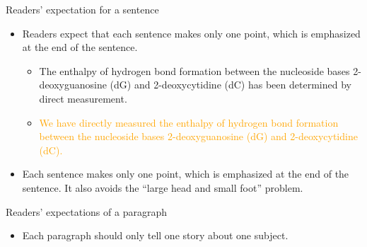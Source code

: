 \documentclass[
 size=14pt,
 paper=smartboard,  %
 mode=present, 		%
 display=slides, 	%
 style=tuliplab,  	%
 pauseslide,
 fleqn,leqno]{powerdot}{}
\begin{document}

\begin{slide}[toc=,bm=]{Readers' expectation for a sentence}
	\begin{itemize}
		\item Readers expect that each sentence makes only one point, which is emphasized at the end of the sentence.
			\begin{itemize}
				\item \textcolor{mygreen!50}{The enthalpy of hydrogen bond formation between the nucleoside bases 2-deoxyguanosine (dG) and 2-deoxycytidine (dC) has been determined by direct measurement.}
				\item \textcolor{orange}{We have directly measured the enthalpy of hydrogen bond formation between the nucleoside bases 2-deoxyguanosine (dG) and 2-deoxycytidine (dC).}
			\end{itemize}
		\item Each sentence makes only one point, which is emphasized at the end of the sentence. It also avoids the “large head and small foot” problem.	
	\end{itemize}
\end{slide}


\begin{slide}[toc=,bm=]{Readers’ expectations of a paragraph}
	\begin{itemize}
		\item Each paragraph should only tell one story about one subject.
	\end{itemize}
\end{slide}

\end{document}
